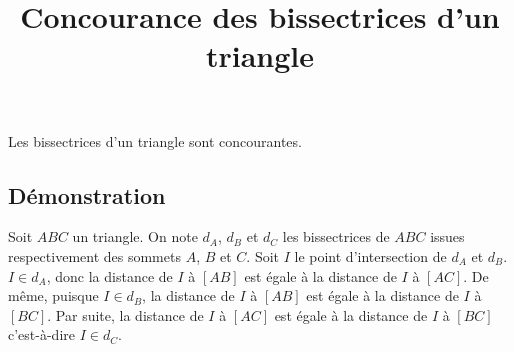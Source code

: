 \documentclass[fontsize=12pt,twoside=false,parskip=half,french]{scrartcl}
\title{Concourance des bissectrices d'un triangle}
\date{}
\author{}
\begin{document}
\maketitle
   \begin{Theoreme}
      Les bissectrices d'un triangle sont concourantes.
   \end{Theoreme}
   \subsection{Démonstration}
      Soit $ABC$ un triangle. On note $d_A$, $d_B$ et $d_C$ les bissectrices
      de $ABC$ issues respectivement des sommets $A$, $B$ et $C$. Soit $I$
      le point d'intersection de $d_A$ et $d_B$. $I \in d_A$, donc
      la distance de $I$ à $[AB]$ est égale à la distance de $I$ à $[AC]$.
      De même, puisque $I \in d_B$, la distance de $I$ à $[AB]$ est égale à 
      la distance de $I$ à $[BC]$. Par suite, la distance de $I$ à $[AC]$ est 
      égale à la distance de $I$ à $[BC]$ c'est-à-dire $I \in d_C$.
\end{document}
